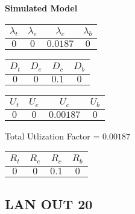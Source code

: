 \documentclass{article}
\begin{document}
\begin{minipage}{0.5\textwidth}
\centering	\textbf{Simulated Model}
\begin{table}[H]
\centering
\begin{tabular}{@{}cccc@{}}
\toprule
$\lambda_t$ & $\lambda_e$ & $\lambda_c$ & $\lambda_b$\\
\midrule
$0$ & $0$ & $0.0187$ & $0$\\
\bottomrule
\end{tabular}
\end{table}
\begin{table}[H]
\centering
\begin{tabular}{@{}cccc@{}}
\toprule
$D_t$ & $D_e$ & $D_c$ & $D_b$\\
\midrule
$0$ & $0$ & $0.1$ & $0$\\
\bottomrule
\end{tabular}
\end{table}\begin{table}[H]
\centering
\begin{tabular}{@{}cccc@{}}
\toprule
$U_t$ & $U_e$ & $U_c$ & $U_b$\\
\midrule
$0$ & $0$ & $0.00187$ & $0$\\
\bottomrule
\end{tabular}
\end{table}
\centering Total Utlization Factor = $0.00187$
\begin{table}[H]
\centering
\begin{tabular}{@{}cccc@{}}
\toprule
$R_t$ & $R_e$ & $R_c$ & $R_b$\\
\midrule
$0$ & $0$ & $0.1$ & $0$\\
\bottomrule
\end{tabular}
\end{table}
\end{minipage}\subsection{LAN OUT 20}
\end{document}
